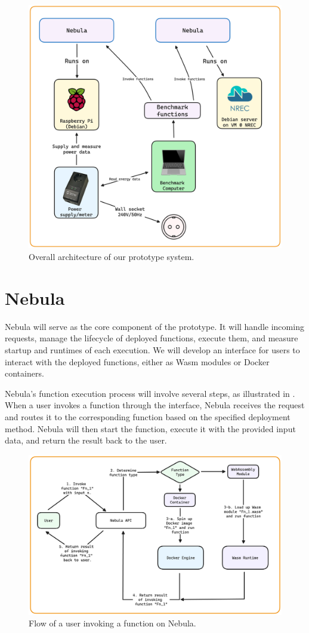\documentclass[
  table]{report}
\begin{document}
\begin{figure}[H]
\centering
  \includegraphics[width=0.7\columnwidth]{assets/5-overall-system-design.png}
  \caption{Overall architecture of our prototype system.}
  \label{fig:system-design}
\end{figure}

\section{Nebula}

Nebula will serve as the core component of the prototype. It will handle
incoming requests, manage the lifecycle of deployed functions, execute
them, and measure startup and runtimes of each execution. We will
develop an interface for users to interact with the deployed functions,
either as \ac{Wasm} modules or Docker containers.

Nebula's function execution process will involve several steps, as
illustrated in . When a user invokes
a function through the interface, Nebula receives the request and routes
it to the corresponding function based on the specified deployment
method. Nebula will then start the function, execute it with the
provided input data, and return the result back to the user.

\begin{figure}[H]
\centering
  \includegraphics{assets/5-nebula-function-execution.png}
  \caption{Flow of a user invoking a function on Nebula.}
  \label{fig:function-exeuction-design}
\end{figure}
\end{document}
